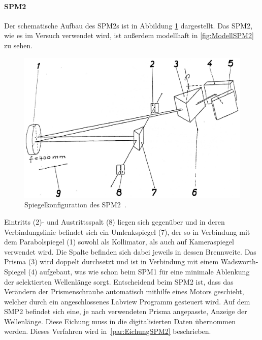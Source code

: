 \documentclass[a4paper,twoside,final]{article}
\begin{document}
\newpage
\paragraph{SPM2}
Der schematische Aufbau des SPM2s ist in Abbildung \ref{fig:SPM2} dargestellt. Das SPM2, wie es im Versuch verwendet wird, ist außerdem modellhaft in \ref{fig:ModellSPM2} zu sehen.

\begin{figure}
    \centering
        \includegraphics[width=\textwidth/2]{Bilder/SPM2.pdf}
    \caption{Spiegelkonfiguration des SPM2~\cite{Mutschke}.}
    \label{fig:SPM2}
\end{figure}

Eintritts (2)- und Austrittsspalt (8) liegen sich gegenüber und in deren Verbindungslinie befindet sich ein Umlenkspiegel (7), der so in Verbindung mit dem Parabolspiegel (1) sowohl als Kollimator, als auch auf Kameraspiegel verwendet wird. Die Spalte befinden sich dabei jeweils in dessen Brennweite. Das Prisma (3) wird doppelt durchsetzt und ist in Verbindung mit einem Wadsworth-Spiegel (4) aufgebaut, was wie schon beim SPM1 für eine minimale Ablenkung der selektierten Wellenlänge sorgt. Entscheidend beim SPM2 ist, dass das Verändern der Prismenschraube automatisch mithilfe eines Motors geschieht, welcher durch ein angeschlossenes Labview Programm gesteuert wird. Auf dem SMP2 befindet sich eine, je nach verwendeten Prisma angepasste, Anzeige der Wellenlänge. Diese Eichung muss in die digitalisierten Daten übernommen werden. Dieses Verfahren wird in~\ref{par:EichungSPM2} beschrieben.


\end{document}
